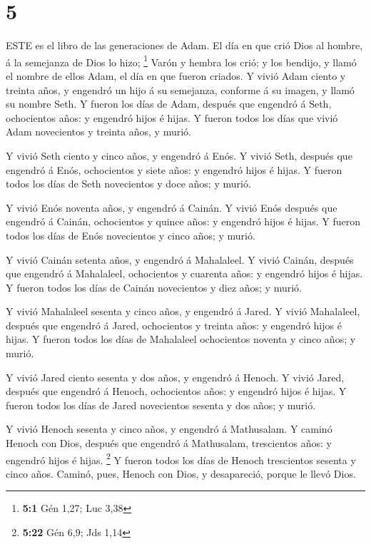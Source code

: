 \hypertarget{section-4}{%
\section{5}\label{section-4}}

 ESTE es el libro de las generaciones de Adam. El día en que
crió Dios al hombre, á la semejanza de Dios lo hizo; \footnote{\textbf{5:1}
  Gén 1,27; Luc 3,38}  Varón y hembra los crió; y los
bendijo, y llamó el nombre de ellos Adam, el día en que fueron criados.
 Y vivió Adam ciento y treinta años, y engendró un hijo á su
semejanza, conforme á su imagen, y llamó su nombre Seth.  Y
fueron los días de Adam, después que engendró á Seth, ochocientos años:
y engendró hijos é hijas.  Y fueron todos los días que vivió
Adam novecientos y treinta años, y murió.

 Y vivió Seth ciento y cinco años, y engendró á Enós.
 Y vivió Seth, después que engendró á Enós, ochocientos y
siete años: y engendró hijos é hijas.  Y fueron todos los
días de Seth novecientos y doce años; y murió.

 Y vivió Enós noventa años, y engendró á Cainán.
 Y vivió Enós después que engendró á Cainán, ochocientos y
quince años: y engendró hijos é hijas.  Y fueron todos los
días de Enós novecientos y cinco años; y murió.

 Y vivió Cainán setenta años, y engendró á Mahalaleel.
 Y vivió Cainán, después que engendró á Mahalaleel,
ochocientos y cuarenta años: y engendró hijos é hijas.  Y
fueron todos los días de Cainán novecientos y diez años; y murió.

 Y vivió Mahalaleel sesenta y cinco años, y engendró á
Jared.  Y vivió Mahalaleel, después que engendró á Jared,
ochocientos y treinta años: y engendró hijos é hijas.  Y
fueron todos los días de Mahalaleel ochocientos noventa y cinco años; y
murió.

 Y vivió Jared ciento sesenta y dos años, y engendró á
Henoch.  Y vivió Jared, después que engendró á Henoch,
ochocientos años: y engendró hijos é hijas.  Y fueron todos
los días de Jared novecientos sesenta y dos años; y murió.

 Y vivió Henoch sesenta y cinco años, y engendró á
Mathusalam.  Y caminó Henoch con Dios, después que engendró
á Mathusalam, trescientos años: y engendró hijos é hijas. \footnote{\textbf{5:22}
  Gén 6,9; Jds 1,14}  Y fueron todos los días de Henoch
trescientos sesenta y cinco años.  Caminó, pues, Henoch con
Dios, y desapareció, porque le llevó Dios.


